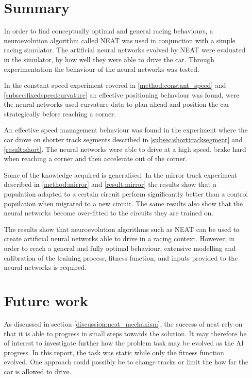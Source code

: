 \chapter{Summary}
In order to find conceptually optimal and general racing behaviours, a neuroevolution algorithm called NEAT was used in conjunction with a simple racing simulator. The artificial neural networks evolved by NEAT were evaluated in the simulator, by how well they were able to drive the car. Through experimentation the behaviour of the neural networks was tested. 

In the constant speed experiment covered in \ref{method:constant_speed} and \ref{subsec:fixedspeedcurvature} an effective positioning behaviour was found, were the neural networks used curvature data to plan ahead and position the car strategically before reaching a corner. 

An effective speed management behaviour was found in the experiment where the car drove on shorter track segments described in \ref{subsec:shorttracksegment} and \ref{result:short}. The neural networks were able to drive at a high speed, brake hard when reaching a corner and then accelerate out of the corner. 

Some of the knowledge acquired is generalised. In the mirror track experiment described in \ref{method:mirror} and \ref{result:mirror} the results show that a population adapted to a certain circuit perform significantly better than a control population when migrated to a new circuit. The same results also show that the neural networks become over-fitted to the circuits they are trained on. 

The results show that neuroevolution algorithms such as NEAT can be used to create artificial neural networks able to drive in a racing context. However, in order to reach a general and fully optimal behaviour, extensive modelling and calibration of the training process, fitness function, and inputs provided to the neural networks is required.  


\chapter{Future work}
As discussed in section \ref{discussion:neat_mechanism}, the success of neat rely on that it is able to progress in small steps towards the solution. It may therefore be of interest to investigate further how the problem task may be evolved as the AI progress. In this report, the task was static while only the fitness function evolved. One approach could possibly be to change tracks or limit the how far the car is allowed to drive.

